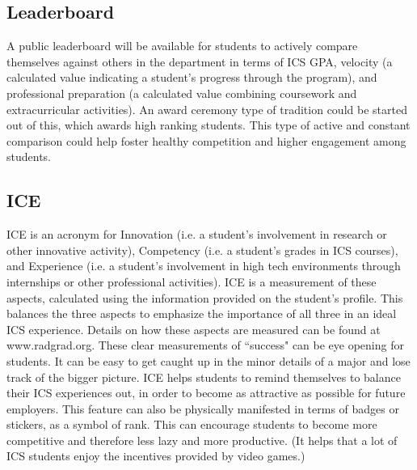 \subsection{Leaderboard}
A public leaderboard will be available for students to actively compare themselves against others in the department in terms of ICS GPA, velocity (a calculated value indicating a student's progress through the program), and professional preparation (a calculated value combining coursework and extracurricular activities). An award ceremony type of tradition could be started out of this, which awards high ranking students. This type of active and constant comparison could help foster healthy competition and higher engagement among students.

\subsection{ICE}
ICE is an acronym for Innovation (i.e. a student's involvement in research or other innovative activity), Competency (i.e. a student's grades in ICS courses), and Experience (i.e. a student's involvement in high tech environments through internships or other professional activities). ICE is a measurement of these aspects, calculated using the information provided on the student's profile. This balances the three aspects to emphasize the importance of all three in an ideal ICS experience. Details on how these aspects are measured can be found at www.radgrad.org. These clear measurements of ``success" can be eye opening for students. It can be easy to get caught up in the minor details of a major and lose track of the bigger picture. ICE helps students to remind themselves to balance their ICS experiences out, in order to become as attractive as possible for future employers. This feature can also be physically manifested in terms of badges or stickers, as a symbol of rank. This can encourage students to become more competitive and therefore less lazy and more productive. (It helps that a lot of ICS students enjoy the incentives provided by video games.)




